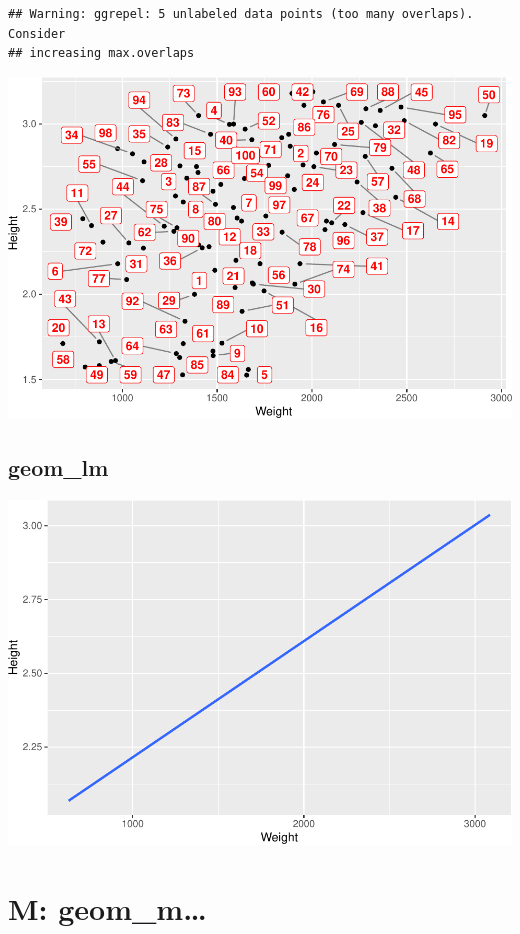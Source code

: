 \documentclass[
]{book}
\begin{document}
\begin{verbatim}
## Warning: ggrepel: 5 unlabeled data points (too many overlaps). Consider
## increasing max.overlaps
\end{verbatim}

\includegraphics{Data-Visualisation-geom-Encyclopedia_files/figure-latex/unnamed-chunk-41-1.pdf}

\hypertarget{geom_lm}{%
\section{geom\_lm}\label{geom_lm}}

\includegraphics{Data-Visualisation-geom-Encyclopedia_files/figure-latex/unnamed-chunk-42-1.pdf}

\hypertarget{m-geom_m}{%
\chapter{M: geom\_m\ldots{}}\label{m-geom_m}}
\end{document}
